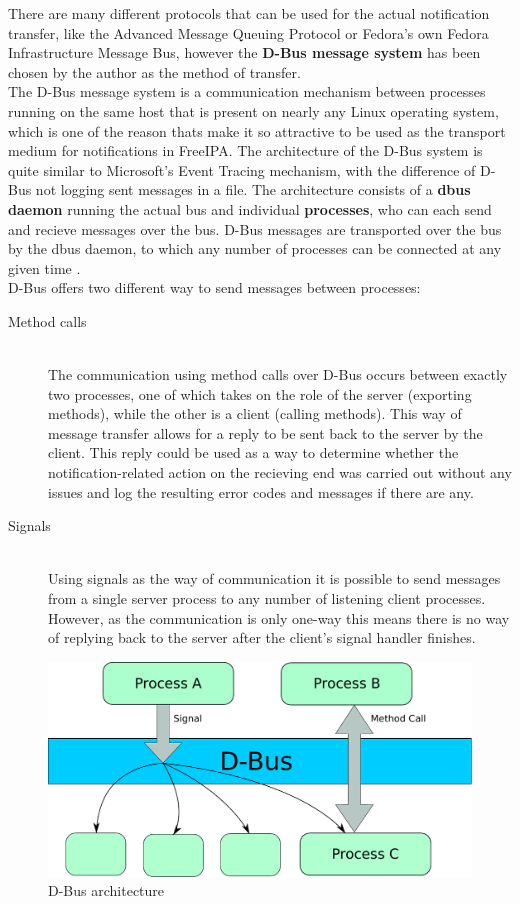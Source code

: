 There are many different protocols that can be used for the actual notification transfer, like the Advanced Message Queuing Protocol or Fedora's own Fedora Infrastructure Message Bus,
however the \textbf{D-Bus message system} has been chosen by the author as the method of transfer.\\
The D-Bus message system is a communication mechanism between processes running on the same host that is present on nearly any Linux operating system,
which is one of the reason thats make it so attractive to be used as the transport medium for notifications in FreeIPA.
The architecture of the D-Bus system is quite similar to Microsoft's Event Tracing mechanism, with the difference of D-Bus not logging sent messages in a file.
The architecture consists of a \textbf{dbus daemon} running the actual bus and individual \textbf{processes}, who can each send and recieve messages over the bus.
D-Bus messages are transported over the bus by the dbus daemon, to which any number of processes can be connected at any given time \cite{dbusWeb}. \\
D-Bus offers two different way to send messages between processes:
\begin{description}
    \item[Method calls]\hfill \\
        The communication using method calls over D-Bus occurs between exactly two processes, one of which takes on the role of the server (exporting methods), while the other is a client (calling methods).
        This way of message transfer allows for a reply to be sent back to the server by the client. This reply could be used as a way to determine whether the notification-related action on the recieving end
        was carried out without any issues and log the resulting error codes and messages if there are any.\\
    \item[Signals]\hfill \\
        Using signals as the way of communication it is possible to send messages from a single server process to any number of listening client processes. However, as the communication is only one-way
        this means there is no way of replying back to the server after the client's signal handler finishes.
\end{description}
\begin{figure}[!ht]
    \centering
        \includegraphics[scale=0.65]{fig/dbus}
    \caption{D-Bus architecture}
    \label{fig:dbus}
\end{figure}
